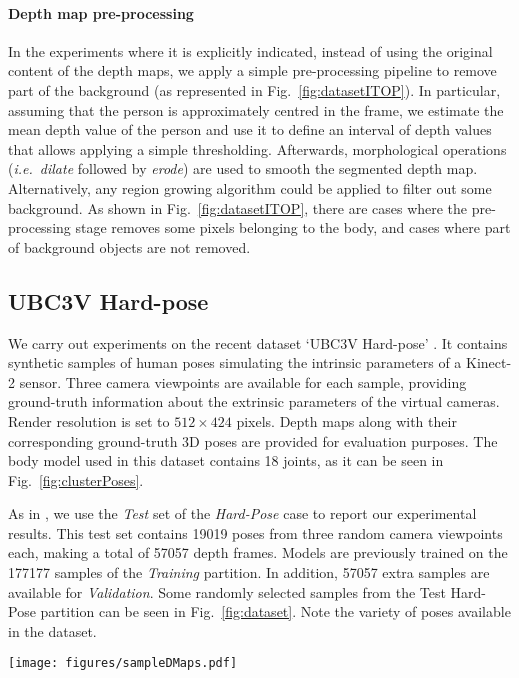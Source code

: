 \documentclass[review,12pt,3p]{elsarticle}
\def \ie{\textit{i.e.}}
\begin{document}
\paragraph{Depth map pre-processing}
In the experiments where it is explicitly indicated, instead of using the original content of the depth maps, we apply a simple pre-processing pipeline to remove part of the background (as represented in Fig.~\ref{fig:datasetITOP}).
In particular, assuming that the person is approximately centred in the frame, we estimate the mean depth value of the person and use it to define an interval of depth values that allows applying a simple thresholding. Afterwards, morphological operations (\ie~\textit{dilate} followed by \textit{erode}) are used to smooth the segmented depth map. 
Alternatively, any region growing algorithm could be applied to filter out some background.
As shown in Fig.~\ref{fig:datasetITOP}, there are cases where the pre-processing stage removes some pixels belonging to the body, and cases where part of background objects are not removed. 

\subsection{UBC3V Hard-pose} \label{subsec:dataubc3v}
We carry out experiments on the recent dataset `UBC3V Hard-pose' \citep{Shafaei16}.
It contains synthetic samples of human poses simulating the intrinsic parameters of a Kinect-2 sensor. Three camera viewpoints are available for each sample, providing ground-truth information about the extrinsic parameters of the virtual cameras. Render resolution is set to $512 \times 424$ pixels. %
Depth maps along with their corresponding ground-truth 3D poses are provided for evaluation purposes. The body model used in this dataset contains 18 joints, as it can be seen in Fig.~\ref{fig:clusterPoses}.

As in \cite{Shafaei16}, we use the \textit{Test} set of the \textit{Hard-Pose} case to report our experimental results. This test set contains 19019 poses from three random camera viewpoints each, making a total of 57057 depth  frames. Models are previously trained on the 177177 samples of the \textit{Training} partition. In addition, 57057 extra samples are available for \textit{Validation}.
Some randomly selected samples from the Test Hard-Pose partition can be seen in Fig.~\ref{fig:dataset}. Note the variety of poses available in the dataset.

\begin{figure*}[tb]
\centering
   \texttt{[image: figures/sampleDMaps.pdf]}
   \caption{\textbf{Sample depth maps from UBC3V dataset}. From left to right, the first three samples correspond to the same pose but from three different camera viewpoints. Note the variety of challenging poses. }
   \label{fig:dataset}
\end{figure*}
\end{document}
